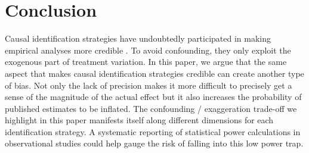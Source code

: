 \documentclass[12pt]{article}
\begin{document}

\section{Conclusion} \label{conclusion}

    Causal identification strategies have undoubtedly participated in making empirical analyses more credible \citep{angrist_credibility_2010}. To avoid confounding, they only exploit the exogenous part of treatment variation. In this paper, we argue that the same aspect that makes causal identification strategies credible can create another type of bias. Not only the lack of precision makes it more difficult to precisely get a sense of the magnitude of the actual effect but it also increases the probability of published estimates to be inflated. The confounding / exaggeration trade-off we highlight in this paper manifests itself along different dimensions for each identification strategy. A systematic reporting of statistical power calculations in observational studies could help gauge the risk of falling into this low power trap. 




\setlength\bibsep{0pt}


\end{document}
